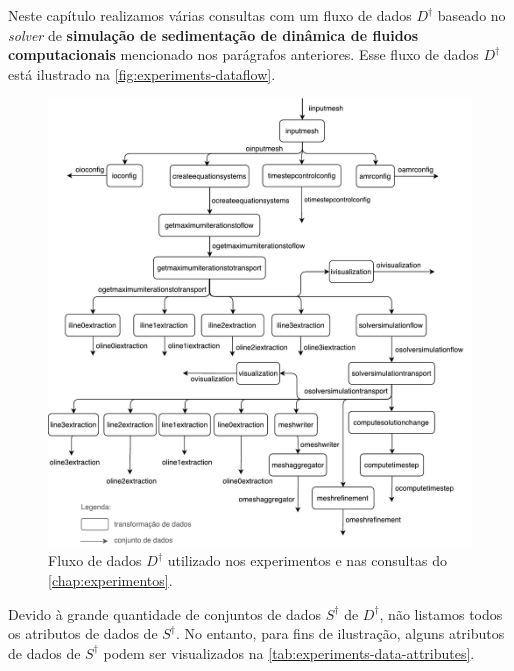 Neste capítulo realizamos várias consultas com um fluxo de dados \(D^{\dagger}\) baseado no \textit{solver} de \textbf{simulação de sedimentação de dinâmica de fluidos computacionais} mencionado nos parágrafos anteriores. Esse fluxo de dados \(D^{\dagger}\) está ilustrado na \autoref{fig:experiments-dataflow}.

\begin{figure}[!htb]
    \centering
    \includegraphics[width=\textwidth]{img/experiments-dataflow}
    \caption[Fluxo de dados $D^{\dagger}$ utilizado nos experimentos]{Fluxo de dados $D^{\dagger}$ utilizado nos experimentos e nas consultas do \autoref{chap:experimentos}.}%
    \label{fig:experiments-dataflow}
\end{figure}

Devido à grande quantidade de conjuntos de dados \(S^{\dagger}\) de \(D^{\dagger}\), não listamos todos os atributos de dados de \(S^{\dagger}\). No entanto, para fins de ilustração, alguns atributos de dados de \(S^{\dagger}\) podem ser visualizados na \autoref{tab:experiments-data-attributes}.

